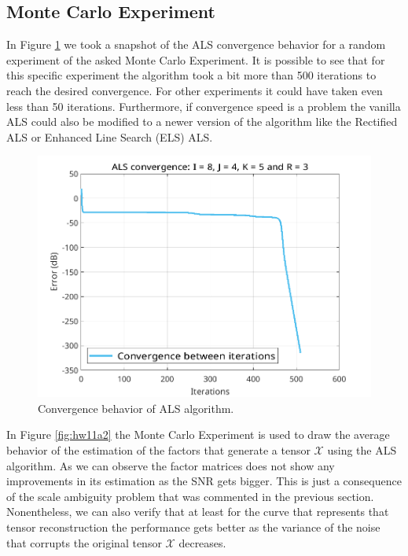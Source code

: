 \documentclass[a4paper,10pt]{article}
\begin{document}
    \newpage
    \subsection*{Monte Carlo Experiment}
    
    In Figure \ref{fig:hw11a1} we took a snapshot of the ALS convergence behavior for a random experiment of the asked Monte Carlo Experiment.
    It is possible to see that for this specific experiment the algorithm took a bit more than 500 iterations to reach the desired convergence.
    For other experiments it could have taken even less than 50 iterations. Furthermore, if convergence speed is a problem the vanilla ALS could 
    also be modified to a newer version of the algorithm like the Rectified ALS or Enhanced Line Search (ELS) ALS. 

    \begin{figure}[ht!]
        \centering 
        \includegraphics[width=0.60\linewidth]{figs/hw11a1.png} \par 
        \caption{Convergence behavior of ALS algorithm.}
        \label{fig:hw11a1} 
    \end{figure}

    In Figure \ref{fig:hw11a2} the Monte Carlo Experiment is used to draw the average behavior of the estimation of the factors 
    that generate a tensor $\mathcal{X}$ using the ALS algorithm. As we can observe the factor matrices does not show any improvements in its 
    estimation as the SNR gets bigger. This is just a consequence of the scale ambiguity problem that was commented in the previous section. Nonentheless, 
    we can also verify that at least for the curve that represents that tensor reconstruction the performance gets better as the variance of the noise that 
    corrupts the original tensor $\mathcal{X}$ decreases.
\end{document}
